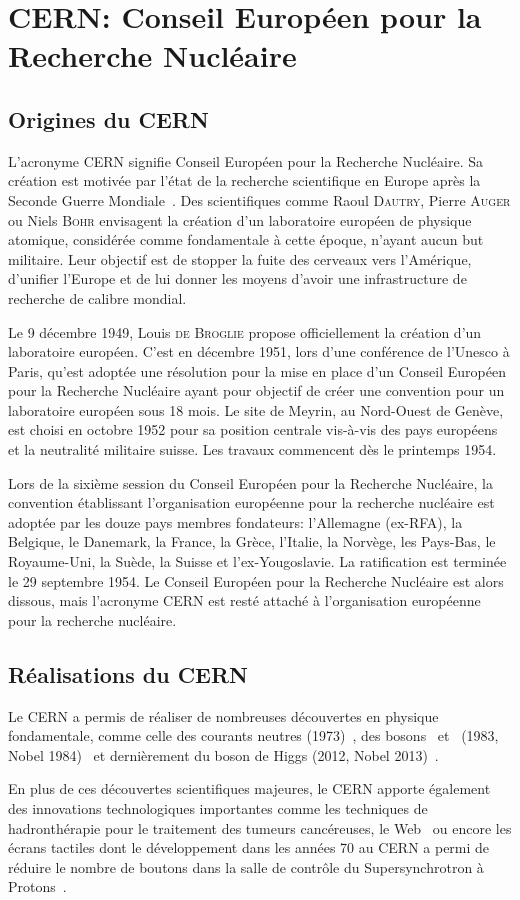 \section{CERN: Conseil Européen pour la Recherche Nucléaire}\label{chapter-LHC-section-CERN}
\subsection{Origines du CERN}
L'acronyme \og CERN \fg{} signifie Conseil Européen pour la Recherche Nucléaire.
Sa création est motivée par l'état de la recherche scientifique en Europe après la Seconde Guerre Mondiale~\cite{CERN_website}.
Des scientifiques comme Raoul \textsc{Dautry}, Pierre \textsc{Auger} ou Niels \textsc{Bohr} envisagent la création d'un laboratoire européen de physique atomique,
considérée comme fondamentale à cette époque,
n'ayant aucun but militaire.
Leur objectif est de stopper la fuite des cerveaux vers l'Amérique, d'unifier l'Europe et de lui donner les moyens d'avoir une infrastructure de recherche de calibre mondial.
\par Le 9 décembre 1949, Louis \textsc{de Broglie} propose officiellement la création d'un laboratoire européen.
C'est en décembre 1951, lors d'une conférence de l'Unesco à Paris, qu'est adoptée une résolution pour la mise en place d'un Conseil Européen pour la Recherche Nucléaire ayant pour objectif de créer une convention pour un laboratoire européen sous 18 mois.
Le site de Meyrin, au Nord-Ouest de Genève, est choisi en octobre 1952 pour sa position centrale vis-à-vis des pays européens et la neutralité militaire suisse. Les travaux commencent dès le printemps 1954.
\par Lors de la sixième session du Conseil Européen pour la Recherche Nucléaire, la convention établissant l'organisation européenne pour la recherche nucléaire est adoptée par les douze pays membres fondateurs: l'Allemagne (ex-RFA), la Belgique, le Danemark, la France, la Grèce, l'Italie, la Norvège, les Pays-Bas, le Royaume-Uni, la Suède, la Suisse et l'ex-Yougoslavie.
La ratification est terminée le 29 septembre 1954.
Le Conseil Européen pour la Recherche Nucléaire est alors dissous, mais l'acronyme CERN est resté attaché à l'organisation européenne pour la recherche nucléaire.
\subsection{Réalisations du CERN}
Le CERN a permis de réaliser de nombreuses découvertes en physique fondamentale, comme
celle des courants neutres (1973)~\cite{Hasert:243640,HASERT1973138,Hasert:203096},
des bosons \Wboson\ et \Zboson\ (1983, Nobel 1984)~\cite{Wboson_discovery1,Wboson_discovery2,Wboson_discovery3,Zboson_discovery1,Zboson_discovery2}
et dernièrement du boson de Higgs (2012, Nobel 2013)~\cite{ATLAS_Higgs_discovery,CMS_Higgs_discovery}.
\par En plus de ces découvertes scientifiques majeures, le CERN apporte également des innovations technologiques importantes
comme
les techniques de hadronthérapie pour le traitement des tumeurs cancéreuses,
le Web~\cite{CERN_web}
ou encore
les écrans tactiles dont le développement dans les années 70 au CERN a permi de réduire le nombre de boutons dans la salle de contrôle du Supersynchrotron à Protons~\cite{CERN_touchscreen}.
